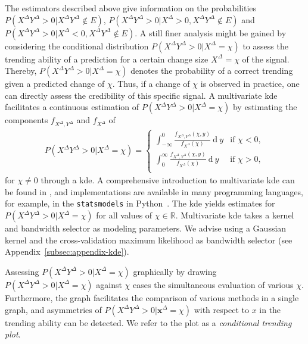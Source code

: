 \documentclass[pdflatex]{sn-jnl}
\theoremstyle{plain}%
\theoremstyle{definition}
\newcommand{\R}{\mathbb{R}}
\newcommand{\diffx}{\mathbf{x}^{\Delta}}
\newcommand{\diffxrv}{X^{\Delta}}
\newcommand{\diffyrv}{Y^{\Delta}}
\newcommand{\xcond}{\chi}
\begin{document}
The estimators described above give information on the probabilities $P(\diffxrv \diffyrv > 0 | \diffxrv \diffyrv \notin E)$, $P(\diffxrv \diffyrv > 0 | \diffxrv > 0, \diffxrv \diffyrv \notin E)$ and $P(\diffxrv \diffyrv > 0 | \diffxrv < 0, \diffxrv \diffyrv \notin E)$.
A still finer analysis might be gained by considering the conditional distribution $P(\diffxrv \diffyrv > 0 | \diffxrv = \xcond)$ to assess the trending ability of a prediction for a certain change size $\diffxrv = \xcond$ of the signal.
Thereby, $P(\diffxrv \diffyrv > 0 | \diffxrv = \xcond)$ denotes the probability of a correct trending given a predicted change of $\xcond$.
Thus, if a change of $\xcond$ is observed in practice, one can directly assess the credibility of this specific signal.
A multivariate \acf{kde} facilitates a continuous estimation of $P(\diffxrv \diffyrv > 0 | \diffxrv = \xcond)$ by estimating the components $f_{\diffxrv, \diffyrv}$ and $f_{\diffxrv}$ of
\begin{align*}
P(\diffxrv \diffyrv > 0 | \diffxrv = \xcond) = \begin{cases}
                                              \int_{-\infty}^0 \frac{f_{\diffxrv, \diffyrv}(\xcond, y)}{f_{\diffxrv}(\xcond)} \ \textrm{d} \: y & \text{if } \xcond < 0, \\
                                              \int_{0}^{\infty} \frac{f_{\diffxrv, \diffyrv}(\xcond, y)}{f_{\diffxrv}(\xcond)} \ \textrm{d} \: y & \text{if } \xcond > 0, \\
\end{cases}
\end{align*}
for $\xcond \neq 0$ through a \ac{kde}.
A comprehensive introduction to multivariate \ac{kde} can be found in \textcite{Gramacki2018}, and implementations are available in many programming languages, for example, in the \verb|statsmodels| in Python~\parencite{Seabold2010}.
The \ac{kde} yields estimates for $P(\diffxrv \diffyrv > 0 | \diffxrv = \xcond)$ for all values of $\xcond \in \R$.
Multivariate \ac{kde} takes a kernel and bandwidth selector as modeling parameters.
We advise using a Gaussian kernel and the cross-validation maximum likelihood as bandwidth selector (see Appendix~\ref{subsec:appendix-kde}).

Assessing $P(\diffxrv \diffyrv > 0 | \diffxrv = \xcond)$ graphically by drawing $P(\diffxrv \diffyrv > 0 | \diffxrv = \xcond)$ against $\xcond$ eases the simultaneous evaluation of various $\xcond$.
Furthermore, the graph facilitates the comparison of various methods in a single graph, and asymmetries of $P(\diffxrv \diffyrv > 0 | \diffx = \xcond)$ with respect to $x$ in the trending ability can be detected.
We refer to the plot as a \textit{conditional trending plot}.
\end{document}
